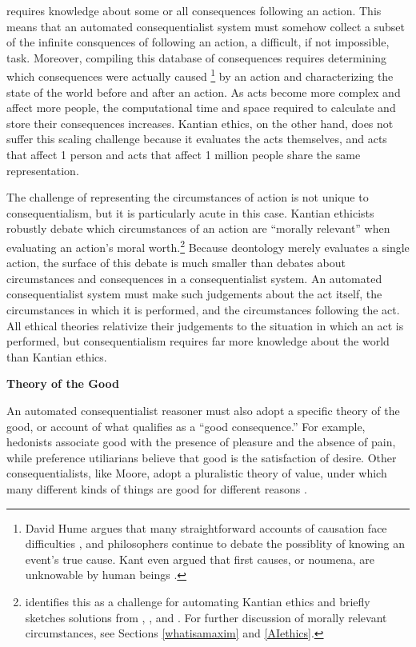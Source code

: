 \begin{isabellebody}
\begin{isamarkuptext}
requires knowledge about some or all consequences following an action. This means that an automated 
consequentialist system must somehow collect a subset of the infinite consquences of following an action, a difficult, 
if not impossible, task. Moreover, compiling this database of consequences requires 
determining which consequences were actually caused \footnote
{David Hume argues that many straightforward accounts of causation face difficulties \citep{hume}, 
and philosophers continue to debate the possiblity of knowing an event's true cause. Kant even argued
that first causes, or noumena, are unknowable by human beings \citep{kantnoumena}.} by an action and
characterizing the state of the world before and after an action. As acts become
more complex and affect more people, the computational time and space required to calculate and store
their consequences increases. Kantian ethics, on the other hand, does not suffer this scaling
challenge because it evaluates the acts themselves, and acts that affect 1 person and acts that 
affect 1 million people share the same representation.

The challenge of representing the circumstances of action is not unique to consequentialism, but it is particularly acute in this case. 
Kantian ethicists robustly debate which circumstances of an action are ``morally relevant'' when evaluating an action's moral worth.\footnote{ 
\citet{powers} identifies this as a challenge for automating Kantian ethics and briefly sketches 
solutions from \citet{constofreason}, \citet{silber}, and \citet{rawlsconstructivism}. For further discussion of
morally relevant circumstances, see Sections \ref{whatisamaxim} and \ref{AIethics}.} Because deontology merely evaluates a 
single action, the surface of this debate is much smaller than debates about circumstances and 
consequences in a consequentialist system. An automated consequentialist system must make such 
judgements about the act itself, the circumstances in which it is performed, and the circumstances 
following the act. All ethical theories relativize their judgements to the situation in which an act 
is performed, but consequentialism requires far more knowledge about the world than Kantian ethics.%
\end{isamarkuptext}\isamarkuptrue%
%
\begin{isamarkuptext}%
\noindent \textbf{Theory of the Good}%
\end{isamarkuptext}\isamarkuptrue%
%
\begin{isamarkuptext}%
An automated consequentialist reasoner must also adopt a specific theory of the good, or account of 
what qualifies as a ``good consequence.'' For example, hedonists associate
good with the presence of pleasure and the absence of pain, while preference utiliarians believe that good is 
the satisfaction of desire. Other consequentialists, like Moore, adopt a pluralistic theory of value, under which 
many different kinds of things are good for different reasons \citep{moorepe}. 


\end{isamarkuptext}
\end{isabellebody}

